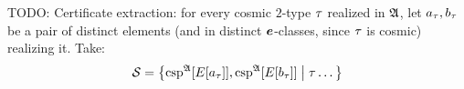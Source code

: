 TODO: Certificate extraction: for every cosmic $2$-type $\tau$ realized in
$\mathfrak{A}$, let $a_\tau, b_\tau$ be a pair of distinct elements (and in
distinct $\bm{e}$-classes, since $\tau$ is cosmic) realizing it. Take:
\[
  \mathcal{S} = \left\{\operatorname{csp}^{\mathfrak{A}}[E[a_\tau]], \operatorname{csp}^{\mathfrak{A}}[E[b_\tau]]\mathrel{}\middle|\mathrel{}\tau
  \dots\right\}
\]